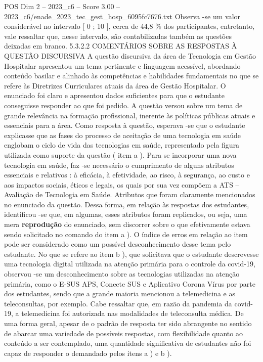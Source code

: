 \begin{textsample}{POS Dim 2 – 2023\_c6 – Score 3.00 – 2023\_c6/enade\_2023\_tec\_gest\_hosp\_6095fc7676.txt}
Observa -se um valor considerável no intervalo [ 0 ; 10 ], cerca de 44,8 \% dos participantes, entretanto, vale ressaltar que, nesse intervalo, são contabilizadas também as questões deixadas em branco. 5.3.2.2 COMENTÁRIOS SOBRE AS RESPOSTAS À QUESTÃO DISCURSIVA A questão discursiva da área de Tecnologia em Gestão Hospitalar apresentou um tema pertinente e linguagem acessível, abordando conteúdo basilar e alinhado às competências e habilidades fundamentais no que se refere às Diretrizes Curriculares atuais da área de Gestão Hospitalar.
O enunciado foi claro e apresentou dados suficientes para que o estudante conseguisse responder ao que foi pedido.
A questão versou sobre um tema de grande relevância na formação profissional, inerente às políticas públicas atuais e essenciais para a área.
Como resposta à questão, esperava -se que o estudante explicasse que as fases do processo de aceitação de uma tecnologia em saúde englobam o ciclo de vida das tecnologias em saúde, representado pela figura utilizada como suporte da questão ( item a ).
Para se incorporar uma nova tecnologia em saúde, faz -se necessário o cumprimento de alguns atributos essenciais e relativos : à eficácia, à efetividade, ao risco, à segurança, ao custo e aos impactos sociais, éticos e legais, os quais por sua vez compõem a ATS – Avaliação de Tecnologia em Saúde.
Atributos que foram claramente mencionados no enunciado da questão.
Dessa forma, em relação às respostas dos estudantes, identificou -se que, em algumas, esses atributos foram replicados, ou seja, uma mera \textbf{reprodução} do enunciado, sem discorrer sobre o que efetivamente estava sendo solicitado no comando do item a ).
O índice de erros em relação ao item pode ser considerado como um possível desconhecimento desse tema pelo estudante.
No que se refere ao item b ), que solicitava que o estudante descrevesse uma tecnologia digital utilizada na atenção primária para o controle da covid-19, observou -se um desconhecimento sobre as tecnologias utilizadas na atenção primária, como o E-SUS APS, Conecte SUS e Aplicativo Corona Vírus por parte dos estudantes, sendo que a grande maioria mencionou a telemedicina e as teleconsultas, por exemplo.
Cabe ressaltar que, em razão da pandemia da covid-19, a telemedicina foi autorizada nas modalidades de teleconsulta médica.
De uma forma geral, apesar de o padrão de resposta ter sido abrangente no sentido de abarcar uma variedade de possíveis respostas, com flexibilidade quanto ao conteúdo a ser contemplado, uma quantidade significativa de estudantes não foi capaz de responder o demandado pelos itens a ) e b ).

\end{textsample}
